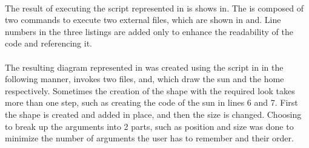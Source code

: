 \paragraph{}
The result of executing the script represented in is shows in. The is composed of two commands to execute two external files, which are shown in and. Line numbers in the three listings are added only to enhance the readability of the code and referencing it.

\paragraph{}
The resulting diagram represented in was created using the script in in the following manner, invokes two files, and, which draw the sun and the home respectively. Sometimes the creation of the shape with the required look takes more than one step, such as creating the code of the sun in lines 6 and 7. First the shape is created and added in place, and then the size is changed. Choosing to break up the arguments into 2 parts, such as position and size was done to minimize the number of arguments the user has to remember and their order.


